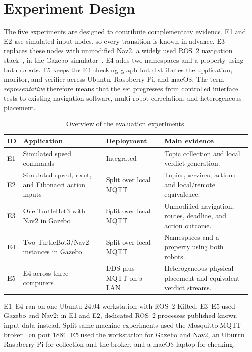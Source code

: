 \section{Experiment Design}

The five experiments are designed to contribute complementary evidence.
E1 and E2 use simulated input nodes, so every transition is known in
advance. E3 replaces these nodes with unmodified Nav2, a widely used ROS~2
navigation stack~\cite{macenski2020marathon}, in the Gazebo
simulator~\cite{koenig2004gazebo}. E4 adds two namespaces and a property using both
robots. E5 keeps the E4 checking graph but distributes the application,
monitor, and verifier across Ubuntu, Raspberry Pi, and macOS. The term
\emph{representative} therefore means that the set progresses from controlled
interface tests to existing navigation software, multi-robot correlation, and
heterogeneous placement.

\begin{table}[htbp]
\centering
\caption{Overview of the evaluation experiments.}
\label{tab:experiments}
\begin{tabular}{
  >{\raggedright\arraybackslash}p{}
  >{\raggedright\arraybackslash}p{}
  >{\raggedright\arraybackslash}p{}
  >{\raggedright\arraybackslash}p{}}
\toprule
\textbf{ID} & \textbf{Application} & \textbf{Deployment} &
\textbf{Main evidence}\\
\midrule
E1 & Simulated speed commands & Integrated & Topic collection and local
verdict generation.\\
E2 & Simulated speed, reset, and Fibonacci action inputs & Split over local
MQTT & Topics, services, actions, and local/remote equivalence.\\
E3 & One TurtleBot3 with Nav2 in Gazebo & Split over local MQTT &
Unmodified navigation, routes, deadline, and action outcome.\\
E4 & Two TurtleBot3/Nav2 instances in Gazebo & Split over local MQTT &
Namespaces and a property using both robots.\\
E5 & E4 across three computers & DDS plus MQTT on a LAN &
Heterogeneous physical placement and equivalent verdict streams.\\
\bottomrule
\end{tabular}
\end{table}

E1--E4 ran on one Ubuntu 24.04 workstation with ROS~2 Kilted. E3--E5 used
Gazebo and Nav2; in E1 and E2, dedicated ROS~2 processes published known
input data instead. Split same-machine experiments used
the Mosquitto MQTT broker~\cite{light2017mosquitto} on port 1884. E5 used the
workstation for Gazebo and Nav2, an Ubuntu
Raspberry Pi for collection and the broker, and a macOS laptop for checking.

